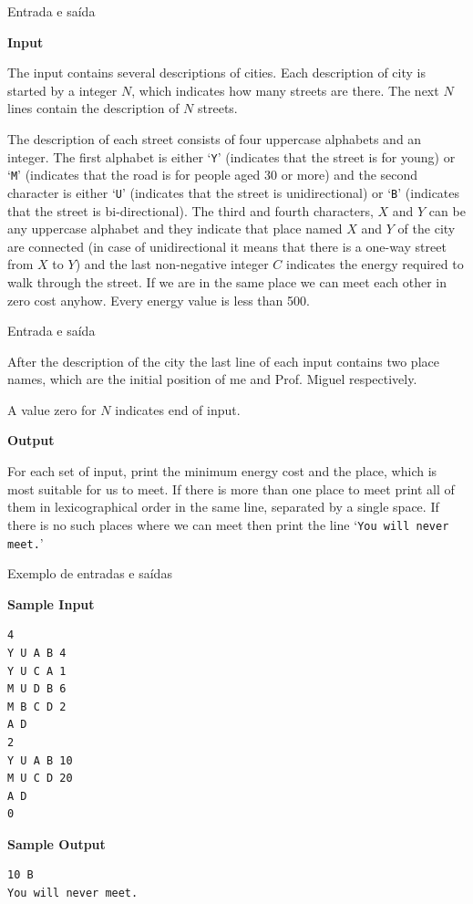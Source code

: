 \begin{frame}[fragile]{Entrada e saída}

\textbf{Input}

The input contains several descriptions of cities. Each description of city is started by a 
integer $N$, which indicates how many streets are there. The next $N$ lines contain the 
description of $N$ streets.  

The description of each street consists of four uppercase alphabets and an integer. The first 
alphabet is either ‘\texttt{Y}’ (indicates that the street is for young) or ‘\texttt{M}’ 
(indicates that the road is for people aged 30 or more) and the second character is either 
‘\texttt{U}’ (indicates that the street is unidirectional) or ‘\texttt{B}’ (indicates that the 
street is bi-directional). The third and fourth characters, $X$ and $Y$ can be any uppercase 
alphabet and they indicate that place named $X$ and $Y$ of the city are connected (in case of
unidirectional it means that there is a one-way street from $X$ to $Y$) and the last non-negative 
integer $C$ indicates the energy required to walk through the street. If we are in the same place 
we can meet each other in zero cost anyhow. Every energy value is less than 500.

\end{frame}

\begin{frame}[fragile]{Entrada e saída}

After the description of the city the last line of each input contains two place names, which are 
the initial position of me and Prof. Miguel respectively.

A value zero for $N$ indicates end of input.

\textbf{Output}

For each set of input, print the minimum energy cost and the place, which is most suitable for us to
meet. If there is more than one place to meet print all of them in lexicographical order in the same
line, separated by a single space. If there is no such places where we can meet then print the line ‘\texttt{You will never meet.}’

\end{frame}

\begin{frame}[fragile]{Exemplo de entradas e saídas}
\begin{minipage}[t]{0.6\textwidth}
\textbf{Sample Input}
\begin{verbatim}
4
Y U A B 4
Y U C A 1
M U D B 6
M B C D 2
A D
2
Y U A B 10
M U C D 20
A D
0
\end{verbatim}
\end{minipage}
\begin{minipage}[t]{0.35\textwidth}
\textbf{Sample Output}
\begin{verbatim}
10 B
You will never meet.
\end{verbatim}
\end{minipage}
\end{frame}


